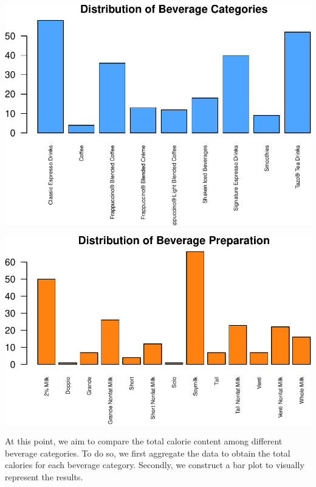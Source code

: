 \documentclass[
]{article}
\begin{document}
\begin{center}\includegraphics{Statistical_Learning_Final_Report_files/figure-latex/beverage_barplot-1} \end{center}

\begin{center}\includegraphics{Statistical_Learning_Final_Report_files/figure-latex/beverage_barplot-2} \end{center}

At this point, we aim to compare the total calorie content among
different beverage categories. To do so, we first aggregate the data to
obtain the total calories for each beverage category. Secondly, we
construct a bar plot to visually represent the results.
\end{document}
